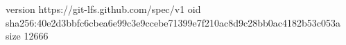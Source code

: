 version https://git-lfs.github.com/spec/v1
oid sha256:40e2d3bbfc6cbea6e99c3e9ccebe71399e7f210ac8d9c28bb0ac4182b53c053a
size 12666
